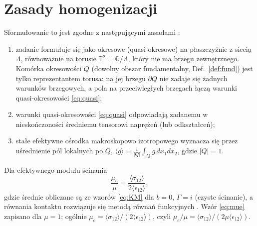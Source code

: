 \documentclass[12pt,a4paper,twoside,openright]{report}
\theoremstyle{definition}
\theoremstyle{remark}
\newcommand{\C}{\mathbb{C}}
\newcommand{\T}{\mathbb{T}}
\begin{document}
\section{Zasady homogenizacji}\label{ssec:homog}

Sformułowanie to jest zgodne z następującymi zasadami \cite{czapla2025computational}:
\begin{enumerate}[nosep]
\item zadanie formułuje się jako okresowe (quasi-okresowe) na płaszczyźnie z siecią $\Lambda$, równoważnie na torusie $\T^2=\C/\Lambda$, który nie ma brzegu zewnętrznego. Komórka okresowości $Q$ (dowolny obszar fundamentalny, Def.~\ref{def:fund}) jest tylko reprezentantem torusa: na jej brzegu $\partial Q$ nie zadaje się żadnych warunków brzegowych, a pola na przeciwległych brzegach łączą warunki quasi-okresowości \eqref{eq:quasi};
\item warunki quasi-okresowości \eqref{eq:quasi} odpowiadają zadanemu w nieskończoności średniemu tensorowi naprężeń (lub odkształceń);
\item stałe efektywne ośrodka makroskopowo izotropowego wyznacza się przez uśrednienie pól lokalnych po $Q$, $\langle g\rangle=\frac1{|Q|}\int_Q g\,dx_1dx_2$, gdzie $|Q|=1$.
\end{enumerate}
Dla efektywnego modułu ścinania
\begin{equation}\label{eq:mue}
\frac{\mu_e}{\mu}=\frac{\langle\sigma_{12}\rangle}{2\langle\epsilon_{12}\rangle},
\end{equation}
gdzie średnie obliczane są ze wzorów \eqref{eq:KM} dla $b=0$, $\Gamma=i$ (czyste ścinanie), a równania kontaktu rozwiązuje się metodą równań funkcyjnych \cite{drygas2019applied}. Wzór \eqref{eq:mue} zapisano dla $\mu=1$; ogólnie $\mu_e=\langle\sigma_{12}\rangle/(2\langle\epsilon_{12}\rangle)$, czyli $\mu_e/\mu=\langle\sigma_{12}\rangle/(2\mu\langle\epsilon_{12}\rangle)$.
\end{document}
